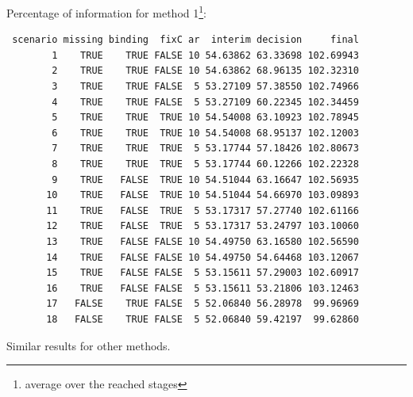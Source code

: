 \documentclass[12pt]{article}
\begin{document}
Percentage of information for method 1\footnote{average over the reached stages}:
\begin{verbatim}
 scenario missing binding  fixC ar  interim decision     final
        1    TRUE    TRUE FALSE 10 54.63862 63.33698 102.69943
        2    TRUE    TRUE FALSE 10 54.63862 68.96135 102.32310
        3    TRUE    TRUE FALSE  5 53.27109 57.38550 102.74966
        4    TRUE    TRUE FALSE  5 53.27109 60.22345 102.34459
        5    TRUE    TRUE  TRUE 10 54.54008 63.10923 102.78945
        6    TRUE    TRUE  TRUE 10 54.54008 68.95137 102.12003
        7    TRUE    TRUE  TRUE  5 53.17744 57.18426 102.80673
        8    TRUE    TRUE  TRUE  5 53.17744 60.12266 102.22328
        9    TRUE   FALSE  TRUE 10 54.51044 63.16647 102.56935
       10    TRUE   FALSE  TRUE 10 54.51044 54.66970 103.09893
       11    TRUE   FALSE  TRUE  5 53.17317 57.27740 102.61166
       12    TRUE   FALSE  TRUE  5 53.17317 53.24797 103.10060
       13    TRUE   FALSE FALSE 10 54.49750 63.16580 102.56590
       14    TRUE   FALSE FALSE 10 54.49750 54.64468 103.12067
       15    TRUE   FALSE FALSE  5 53.15611 57.29003 102.60917
       16    TRUE   FALSE FALSE  5 53.15611 53.21806 103.12463
       17   FALSE    TRUE FALSE  5 52.06840 56.28978  99.96969
       18   FALSE    TRUE FALSE  5 52.06840 59.42197  99.62860
\end{verbatim}

Similar results for other methods.
\end{document}
